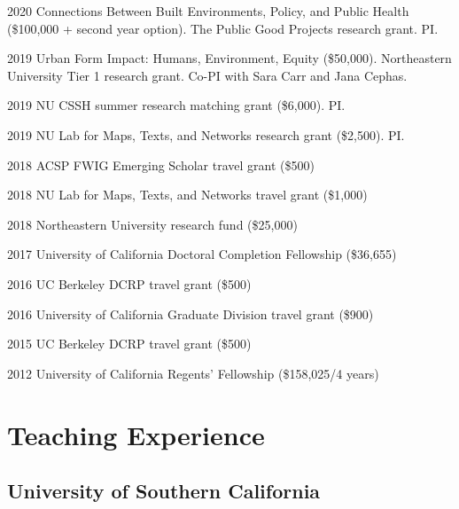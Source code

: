 \documentclass[12pt,letterpaper]{report}
\begin{document}
    \begin{tablist}

        \item[2020] \tab Connections Between Built Environments, Policy, and Public Health (\$100,000 + second year option). The Public Good Projects research grant. PI.
        
        \item[2019] \tab Urban Form Impact: Humans, Environment, Equity (\$50,000). Northeastern University Tier 1 research grant. Co-PI with Sara Carr and Jana Cephas.

        \item[2019] \tab NU CSSH summer research matching grant (\$6,000). PI.

        \item[2019] \tab NU Lab for Maps, Texts, and Networks research grant (\$2,500). PI.

        \item[2018] \tab ACSP FWIG Emerging Scholar travel grant (\$500)

        \item[2018] \tab NU Lab for Maps, Texts, and Networks travel grant (\$1,000)

        \item[2018] \tab Northeastern University research fund (\$25,000)

        \item[2017] \tab University of California Doctoral Completion Fellowship (\$36,655)

        \item[2016] \tab UC Berkeley DCRP travel grant (\$500)

        \item[2016] \tab University of California Graduate Division travel grant (\$900)

        \item[2015] \tab UC Berkeley DCRP travel grant (\$500)

        \item[2012] \tab University of California Regents' Fellowship (\$158,025/4 years)

    \end{tablist}



    \section*{Teaching Experience}

    \subsection*{University of Southern California}
    
\end{document}
